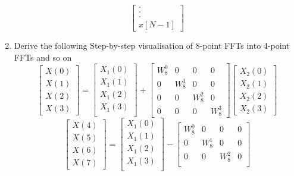 \documentclass[journal,12pt,twocolumn]{IEEEtran}
\renewcommand\thesection{\arabic{section}}
\begin{document}
\begin{enumerate}[label=\arabic*.,ref=\thesection.\theenumi]
\begin{solution}
\begin{equation}
\begin{bmatrix}
		. \\
		. \\
		. \\
		x[N-1]
	\end{bmatrix}
\end{equation}
\end{solution}
\item Derive the following Step-by-step visualisation  of
8-point FFTs into 4-point FFTs and so on
\begin{equation}
\begin{bmatrix}
X(0) \\ 
X(1) \\ 
X(2) \\ 
X(3)
\end{bmatrix}
=
\begin{bmatrix}
X_{1}(0) \\ 
X_{1}(1)\\ 
X_{1}(2)\\
X_{1}(3)\\
\end{bmatrix}
+
\begin{bmatrix}
W^{0}_{8} & 0 & 0 & 0\\
0 & W^{1}_{8} & 0 & 0\\
0 & 0 & W^{2}_{8} & 0\\
0 & 0 & 0 & W^{3}_{8}
\end{bmatrix}
\begin{bmatrix}
X_{2}(0) \\ 
X_{2}(1) \\ 
X_{2}(2) \\
X_{2}(3)
\end{bmatrix}
\end{equation}
\begin{equation}
\begin{bmatrix}
X(4) \\ 
X(5) \\ 
X(6) \\ 
X(7)
\end{bmatrix}
=
\begin{bmatrix}
X_{1}(0) \\ 
X_{1}(1)\\ 
X_{1}(2)\\
X_{1}(3)\\
\end{bmatrix}
-
\begin{bmatrix}
W^{0}_{8} & 0 & 0 & 0\\
0 & W^{1}_{8} & 0 & 0\\
0 & 0 & W^{2}_{8} & 0\\

\end{bmatrix}
\end{equation}
\end{enumerate}
\end{document}
